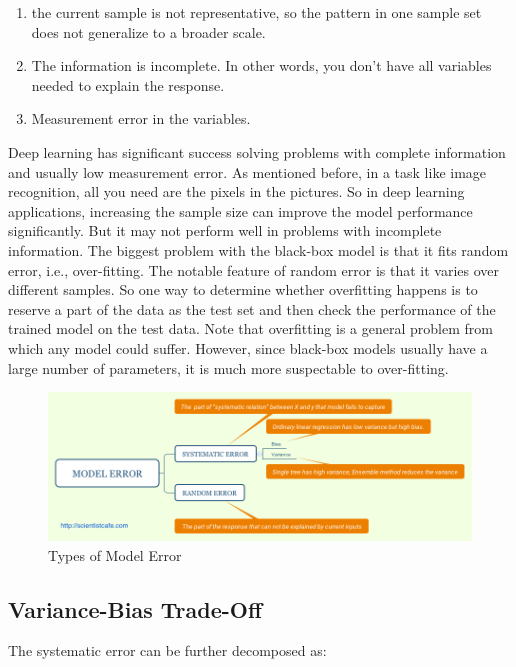 \documentclass[12pt,]{krantz}
\providecommand{\tightlist}{%
  \setlength{\itemsep}{0pt}\setlength{\parskip}{0pt}}
\begin{document}
\begin{enumerate}
\def\labelenumi{\arabic{enumi}.}
\tightlist
\item
  the current sample is not representative, so the pattern in one sample set does not generalize to a broader scale.
\item
  The information is incomplete. In other words, you don't have all variables needed to explain the response.
\item
  Measurement error in the variables.
\end{enumerate}

Deep learning has significant success solving problems with complete information and usually low measurement error. As mentioned before, in a task like image recognition, all you need are the pixels in the pictures. So in deep learning applications, increasing the sample size can improve the model performance significantly. But it may not perform well in problems with incomplete information. The biggest problem with the black-box model is that it fits random error, i.e., over-fitting. The notable feature of random error is that it varies over different samples. So one way to determine whether overfitting happens is to reserve a part of the data as the test set and then check the performance of the trained model on the test data. Note that overfitting is a general problem from which any model could suffer. However, since black-box models usually have a large number of parameters, it is much more suspectable to over-fitting.

\begin{figure}
\centering
\includegraphics{images/ModelError.png}
\caption{Types of Model Error}
\end{figure}

\hypertarget{vbtradeoff}{%
\subsection{Variance-Bias Trade-Off}\label{vbtradeoff}}

The systematic error can be further decomposed as:
\end{document}
